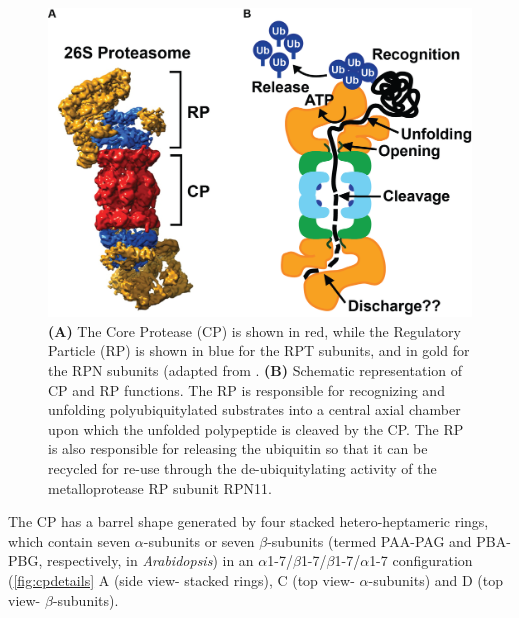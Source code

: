 \begin{figure}[p]
	\centering
	\includegraphics[width=\columnwidth]{intro/proteasome.png}
	{ \textbf{(A)} The Core Protease (CP) is shown in red, while the Regulatory Particle (RP) is shown in blue for the RPT subunits, and in gold for the RPN subunits (adapted from \citep{lasker12}. \textbf{(B)} Schematic representation of CP and RP functions. The RP is responsible for recognizing and unfolding polyubiquitylated substrates into a central axial chamber upon which the unfolded polypeptide is cleaved by the CP. The RP is also responsible for releasing the ubiquitin so that it can be recycled for re-use through the de-ubiquitylating activity of the metalloprotease RP subunit RPN11. }
	\label{fig:proteasome}
\end{figure}

The CP has a barrel shape generated by four stacked hetero-heptameric rings, which contain seven $\alpha$-subunits or seven $\beta$-subunits (termed PAA-PAG and PBA-PBG, respectively, in \textit{Arabidopsis}) in an $\alpha$1-7/$\beta$1-7/$\beta$1-7/$\alpha$1-7 configuration (\ref{fig:cpdetails} A (side view- stacked rings), C (top view- $\alpha$-subunits) and D (top view- $\beta$-subunits).

